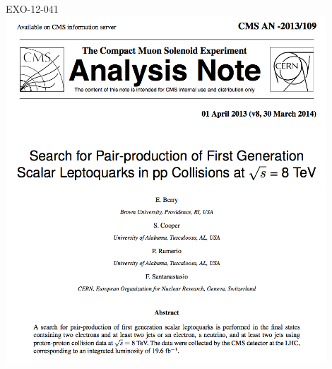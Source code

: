 \documentclass[bigger]{beamer}
\begin{document}
\begin{frame}
\begin{columns}
\begin{column}{0.5\textwidth}
\begin{block}{EXO-12-041}
\centering
\includegraphics[width=0.9\textwidth]{fig/an/an.png}
\end{block}
\end{column}
\end{columns}
\end{frame}
\end{document}
